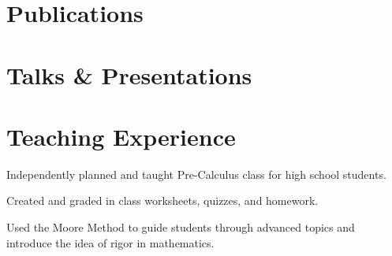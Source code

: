 \documentclass{cultvoucher}
\begin{document}
\vspace{-0.3\topsep}

\raggedright
{}
\begin{paracol}{2}

\section{Publications}



\switchcolumn


\section{Talks \& Presentations}

\end{paracol}
\vspace{-2\topsep}


\section{Teaching Experience}
\begin{tightitemize}
	\item Independently planned and taught Pre-Calculus class for high school
          students.
	\item Created and graded in class worksheets, quizzes, and homework.
	\item Used the Moore Method to guide students through advanced topics and
          introduce the idea of rigor in mathematics.
\end{tightitemize}
\vspace{\topsep}
\end{document}
